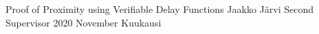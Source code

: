 \iffin
{}
\renewcommand{\appname}{Liitteet}
\else
{}
\renewcommand{\appname}{Appendices}
\fi

{Proof of Proximity using Verifiable Delay Functions}
{Jaakko Järvi}
{Second Supervisor}
{2020}
{November}
{Kuukausi}


\gentitle



%
%
\pagestyle{empty}


%
%
\tableofcontents
\clearpage

%
%
%

